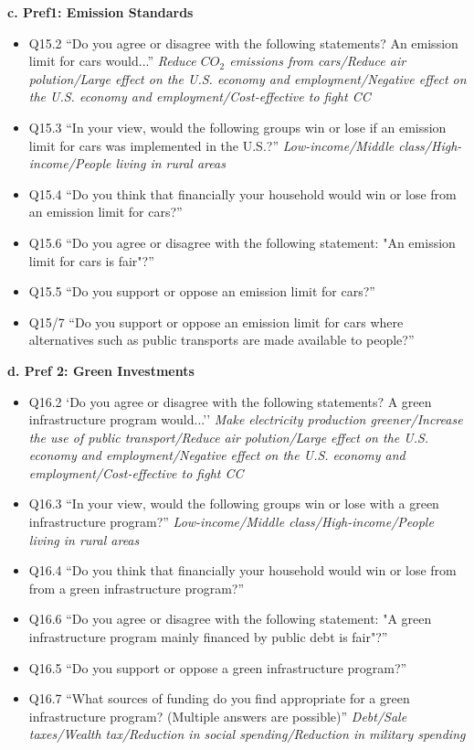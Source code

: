 \documentclass{article}
\begin{document}
\begin{flushleft}
\textbf{c. Pref1: Emission Standards}
\end{flushleft}

\begin{itemize}
    \item Q15.2 ``Do you agree or disagree with the following statements? An emission limit for cars would...'' \textit{Reduce $CO_2$ emissions from cars/Reduce air polution/Large effect on the U.S. economy and employment/Negative effect on the U.S. economy and employment/Cost-effective to fight CC}
    \item Q15.3 ``In your view, would the following groups win or lose if an emission limit for cars was implemented in the U.S.?'' \textit{Low-income/Middle class/High-income/People living in rural areas}
    \item Q15.4 ``Do you think that financially your household would win or lose from an emission limit for cars?''
    \item Q15.6 ``Do you agree or disagree with the following statement: "An emission limit for cars is fair"?''
    \item Q15.5 ``Do you support or oppose an emission limit for cars?''
    \item Q15/7 ``Do you support or oppose an emission limit for cars where alternatives such as public transports are made available to people?''    
\end{itemize}

\begin{flushleft}
\textbf{d. Pref 2: Green Investments}
\end{flushleft}

\begin{itemize}
    \item Q16.2 `Do you agree or disagree with the following statements? A green infrastructure program would...'' \textit{Make electricity production greener/Increase the use of public transport/Reduce air polution/Large effect on the U.S. economy and employment/Negative effect on the U.S. economy and employment/Cost-effective to fight CC}
    \item Q16.3 ``In your view, would the following groups win or lose with a green infrastructure program?'' \textit{Low-income/Middle class/High-income/People living in rural areas}
    \item Q16.4 ``Do you think that financially your household would win or lose from from a green infrastructure program?''
    \item Q16.6 ``Do you agree or disagree with the following statement: "A green infrastructure program mainly financed by public debt is fair"?''
    \item Q16.5 ``Do you support or oppose a green infrastructure program?''
    \item Q16.7 ``What sources of funding do you find appropriate for a green infrastructure program? (Multiple answers are possible)'' \textit{Debt/Sale taxes/Wealth tax/Reduction in social spending/Reduction in military spending}   
\end{itemize}
\end{document}
